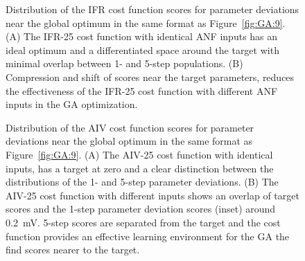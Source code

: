   \begin{figure}[htb]
    \centering

    \caption{Distribution of the IFR cost function scores for
      parameter deviations near the global optimum in the same format
      as Figure~\ref{fig:GA:9}.  (A) The IFR-25 cost function with
      identical {ANF} inputs has an ideal optimum and a differentiated
      space around the target with minimal overlap between 1- and
      5-step populations. (B) Compression and shift of scores near the
      target parameters, reduces the effectiveness of the IFR-25 cost
      function with different {ANF} inputs in the {GA} optimization. %
    }
    \label{fig:GA:10}
  \end{figure}



  \begin{figure}[htb]
    \centering
    \caption{Distribution of the AIV cost function scores for
      parameter deviations near the global optimum in the same format
      as Figure~\ref{fig:GA:9}.  (A) The AIV-25 cost function with
      identical inputs, has a target at zero and a clear distinction
      between the distributions of the 1- and 5-step parameter
      deviations.  (B) The AIV-25 cost function with different inputs
      shows an overlap of target scores and the 1-step parameter
      deviation scores (inset) around 0.2~mV. 5-step scores are
      separated from the target and the cost function provides an
      effective learning environment for the {GA} the find scores nearer
      to the target. %
    }
    \label{fig:GA:11}
  \end{figure}


